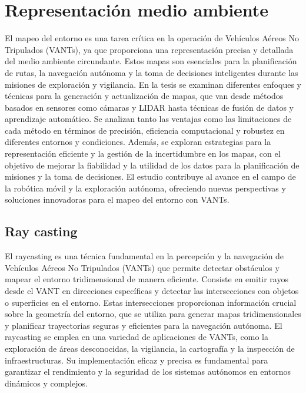 \section{Representación medio ambiente}

El mapeo del entorno es una tarea crítica en la operación de Vehículos Aéreos No Tripulados (VANTs), ya que proporciona una representación precisa y detallada del medio ambiente circundante. Estos mapas son esenciales para la planificación de rutas, la navegación autónoma y la toma de decisiones inteligentes durante las misiones de exploración y vigilancia. En la tesis se examinan diferentes enfoques y técnicas para la generación y actualización de mapas, que van desde métodos basados en sensores como cámaras y LIDAR hasta técnicas de fusión de datos y aprendizaje automático. Se analizan tanto las ventajas como las limitaciones de cada método en términos de precisión, eficiencia computacional y robustez en diferentes entornos y condiciones. Además, se exploran estrategias para la representación eficiente y la gestión de la incertidumbre en los mapas, con el objetivo de mejorar la fiabilidad y la utilidad de los datos para la planificación de misiones y la toma de decisiones. El estudio contribuye al avance en el campo de la robótica móvil y la exploración autónoma, ofreciendo nuevas perspectivas y soluciones innovadoras para el mapeo del entorno con VANTs.

\subsection{Ray casting}

El raycasting es una técnica fundamental en la percepción y la navegación de Vehículos Aéreos No Tripulados (VANTs) que permite detectar obstáculos y mapear el entorno tridimensional de manera eficiente. Consiste en emitir rayos desde el VANT en direcciones específicas y detectar las intersecciones con objetos o superficies en el entorno. Estas intersecciones proporcionan información crucial sobre la geometría del entorno, que se utiliza para generar mapas tridimensionales y planificar trayectorias seguras y eficientes para la navegación autónoma. El raycasting se emplea en una variedad de aplicaciones de VANTs, como la exploración de áreas desconocidas, la vigilancia, la cartografía y la inspección de infraestructuras. Su implementación eficaz y precisa es fundamental para garantizar el rendimiento y la seguridad de los sistemas autónomos en entornos dinámicos y complejos.

